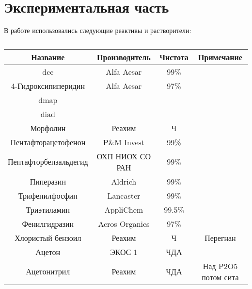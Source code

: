 \section{Экспериментальная часть}
В работе использовались следующие реактивы и растворители:
\begin{table}[h!]
    \centering
    \caption{}
    \begin{small}
        \begin{tabular}{cccc}
            \toprule
            \textbf{Название}     & \textbf{Производитель} & \textbf{Чистота} & \textbf{Примечание} \\
            \midrule
            \ac{dcc}              & Alfa Aesar             & 99\%             &                     \\
            4-Гидроксипиперидин   & Alfa Aesar             & 97\%             &                     \\
            \ac{dmap}             &                        &                  &                     \\
            \ac{diad}             &                        &                  &                     \\
            Морфолин              & Реахим                 & Ч                &                     \\
            Пентафторацетофенон   & P\&M Invest            & 99\%             &                     \\
            Пентафторбензальдегид & ОХП НИОХ СО РАН        & 99\%             &                     \\
            Пиперазин             & Aldrich                & 99\%             &                     \\
            Трифенилфосфин        & Lancaster              & 99\%             &                     \\
            Триэтиламин           & AppliChem              & 99.5\%           &                     \\
            Фенилгидразин         & Acros Organics         & 97\%             &                     \\
            Хлористый бензоил     & Реахим                 & Ч                & Перегнан            \\
            \midrule
            Ацетон                & ЭКОС 1                 & ЧДА              &                     \\
            Ацетонитрил           & Реахим                 & ЧДА              & Над P2O5 потом сита \\

\end{tabular}
\end{small}
\end{table}

